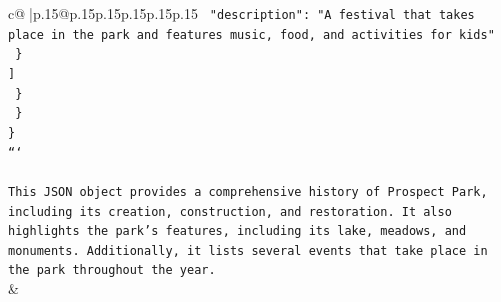 \documentclass{article}
\begin{document}
{\begin{supertabular}{c@{$\;$}|p{.15\linewidth}@{}p{.15\linewidth}p{.15\linewidth}p{.15\linewidth}p{.15\linewidth}p{.15\linewidth}}
{{{\texttt{          "description": "A festival that takes place in the park and features music, food, and activities for kids"} \\
\texttt{        \}} \\
\texttt{      {]}} \\
\texttt{    \}} \\
\texttt{  \}} \\
\texttt{\}} \\
\texttt{```} \\
\\ 
\texttt{This JSON object provides a comprehensive history of Prospect Park, including its creation, construction, and restoration. It also highlights the park's features, including its lake, meadows, and monuments. Additionally, it lists several events that take place in the park throughout the year.} \\
            }
        }
    }
    & \\ \\


\end{supertabular}}
\end{document}
